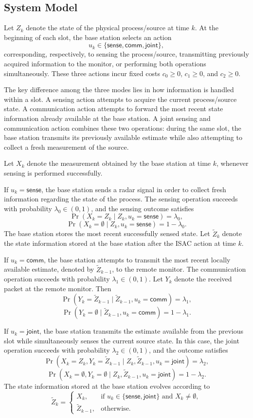 \documentclass[letterpaper,journal]{IEEEtran}
\begin{document}
\subsection{System Model}

Let $Z_k$ denote the state of the physical process/source at time $k$. At the beginning of each slot, the base station selects an action
\[
u_k\in\{\mathsf{sense},\mathsf{comm},\mathsf{joint}\},
\]
corresponding, respectively, to sensing the process/source, transmitting previously acquired information to the monitor, or performing both operations simultaneously. These three actions incur fixed costs $c_0\geq 0$, $c_1\geq 0$, and $c_2\geq 0$.

The key difference among the three modes lies in how information is handled within a slot. A sensing action attempts to acquire the current process/source state. A communication action attempts to forward the most recent state information already available at the base station. A joint sensing and communication action combines these two operations: during the same slot, the base station transmits its previously available estimate while also attempting to collect a fresh measurement of the source.

Let $X_k$ denote the measurement obtained by the base station at time $k$, whenever sensing is performed successfully.

If $u_k=\mathsf{sense}$, the base station sends a radar signal in order to collect fresh information regarding the state of the process. The sensing operation succeeds with probability $\lambda_0\in(0,1)$, and the sensing outcome satisfies
\[
\Pr(X_k = Z_k \mid Z_k, u_k = \mathsf{sense}) = \lambda_0,
\]
\[
\Pr(X_k = \emptyset \mid Z_k, u_k = \mathsf{sense}) = 1 - \lambda_0.
\]
The base station stores the most recent successfully sensed state. Let $\tilde Z_k$ denote the state information stored at the base station after the ISAC action at time $k$.

If $u_k=\mathsf{comm}$, the base station attempts to transmit the most recent locally available estimate, denoted by $\tilde Z_{k-1}$, to the remote monitor. The communication operation succeeds with probability $\lambda_1\in(0,1)$. Let $Y_k$ denote the received packet at the remote monitor. Then
\[
\Pr(Y_k = \tilde Z_{k-1} \mid \tilde Z_{k-1}, u_k = \mathsf{comm}) = \lambda_1,
\]
\[
\Pr(Y_k = \emptyset \mid \tilde Z_{k-1}, u_k = \mathsf{comm}) = 1 - \lambda_1.
\]

If $u_k=\mathsf{joint}$, the base station transmits the estimate available from the previous slot while simultaneously senses the current source state. In this case, the joint operation succeeds with probability $\lambda_2\in(0,1)$, and the outcome satisfies
\[
\Pr(X_k = Z_k, Y_k = \tilde Z_{k-1} \mid Z_k, \tilde Z_{k-1}, u_k = \mathsf{joint}) = \lambda_2,
\]
\[
\Pr(X_k = \emptyset, Y_k = \emptyset \mid Z_k, \tilde Z_{k-1}, u_k = \mathsf{joint}) = 1 - \lambda_2.
\]
The state information stored at the base station evolves according to
\[
\tilde Z_k =
\begin{cases}
X_k, & \text{if } u_k \in \{\mathsf{sense},\mathsf{joint}\} \text{ and } X_k \neq \emptyset,\\
\tilde Z_{k-1}, & \text{otherwise.}
\end{cases}
\]
\end{document}

